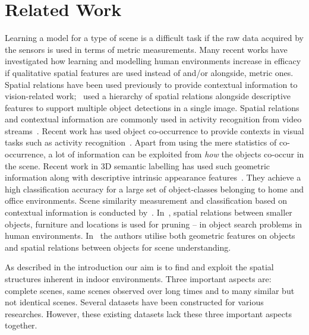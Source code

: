 \documentclass[letterpaper, 10 pt, conference]{ieeeconf}
\begin{document}
\section{Related Work}
\label{sec:Related Work}
Learning a model for a type of scene is a difficult task if the raw data
acquired by the sensors is used in terms of metric measurements. Many
recent works have investigated how learning and modelling human
environments increase in efficacy if qualitative spatial features are
used instead of and/or alongside, metric ones. Spatial relations have been used
previously to provide contextual information to vision-related
work;~\cite{MyungJin:CVPR2010} used a hierarchy of spatial relations
alongside descriptive features to support multiple object detections
in a single image. Spatial relations and contextual information are
commonly used in activity recognition from video
streams~\cite{Krishna:ECAI2010, Behera2012}. Recent work has used
object co-occurrence to provide contexts in visual tasks such as
activity recognition~\cite{Li:2012}. Apart from using the mere
statistics of co-occurrence, a lot of information can be exploited
from \textit{how} the objects co-occur in the scene. Recent work in 3D
semantic labelling has used such geometric information along with
descriptive intrinsic appearance
features~\cite{Koppula:NIPS2011}. They achieve a high classification
accuracy for a large set of object-classes belonging to home and
office environments. Scene similarity measurement and classification
based on contextual information is conducted
by~\cite{Fisher:ACMT2011}. In~\cite{Aydemir:ICRA2011}, spatial
relations between smaller objects, furniture and locations is used for
pruning -- in object search problems in human
environments. In~\cite{Southey:2007,kasper:2011} the authors utilise
both geometric features on objects and spatial relations between
objects for scene understanding.

As described in the introduction our aim is to find and exploit the
spatial structures inherent in indoor environments. Three important
aspects are: complete scenes, same scenes observed over long times 
and to many similar but not identical scenes. Several datasets have 
been constructed for various researches. However, these existing 
datasets lack these three important aspects together.
\end{document}
